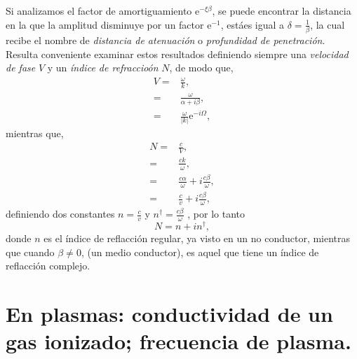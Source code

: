 \documentclass[11pt,fleqn]{book} %
\begin{document}
Si analizamos el factor de amortiguamiento $\text{e}^{-\xi\beta}$, se puede encontrar la distancia en la que la amplitud disminuye por un factor $\text{e}^{-1}$, est\'aes igual a $\delta=\frac{1}{\beta}$, la cual recibe el nombre de \textit{distancia de atenuaci\'on } o \textit{profundidad de penetraci\'on}.\\
Resulta conveniente examinar estos resultados definiendo siempre una \textit{velocidad de fase} $V$ y un \textit{\'indice de refraccio\'on} $N$, de modo que,
\begin{equation*}
 \begin{split}
 V=&\frac{\omega}{k},\\
 =&\frac{\omega}{\alpha+i\beta},\\
=&\frac{\omega}{|k|}\text{e}^{-i\Omega},
 \end{split}
 \end{equation*}
 mientras que,
\begin{equation*}
 \begin{split}
 N=&\frac{c}{V},\\
 =&\frac{ck}{\omega},\\
=&\frac{c\alpha}{\omega}+i\frac{c\beta}{\omega},\\
=&\frac{c}{v}+i\frac{c\beta}{\omega},
 \end{split}
 \end{equation*}
definiendo dos constantes $n=\frac{c}{v}$ y $n^{\dagger}=\frac{c\beta}{\omega}$ , por lo tanto
\begin{equation}
N=n+in^{\dagger},
\end{equation}
donde $n$ es el \'indice de reflacci\'on regular, ya visto en un no conductor, mientras que cuando $\beta\neq 0$, (un medio conductor), es aquel que tiene un \'indice de reflacci\'on complejo.
\section{En plasmas: conductividad de un gas ionizado; frecuencia de plasma.}
\end{document}
